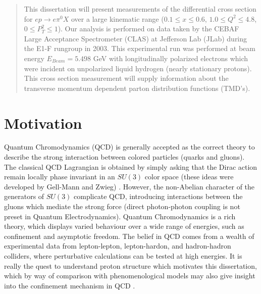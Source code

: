 \begin{abstract}

This dissertation will present measurements of the differential cross section for $e p \rightarrow e \pi^{0} X$ over a large kinematic range ($0.1 \leq x \leq 0.6$, $1.0 \leq Q^{2} \leq 4.8$, $0 \leq P_{T}^{2} \leq 1$).  Our analysis is performed on data taken by the CEBAF Large Acceptance Spectrometer (CLAS) at Jefferson Lab (JLab) during the E1-F rungroup in 2003.  This experimental run was performed at beam energy $E_{Beam} = 5.498$ GeV with longitudinally polarized electrons which were incident on unpolarized liquid hydrogen (nearly stationary protons).  This cross section measurement will supply information about the transverse momentum dependent parton distribution functions (TMD's).

\end{abstract}

\section{Motivation}
Quantum Chromodynamics (QCD) is generally accepted as the correct theory to describe the strong interaction between colored particles (quarks and gluons).  The classical QCD Lagrangian is obtained by simply asking that the Dirac action remain locally phase invariant in an $SU(3)$ color space (these ideas were developed by Gell-Mann and Zwieg) \cite{zwieg}.  However, the non-Abelian character of the generators of $SU(3)$ complicate QCD, introducing interactions between the gluons which mediate the strong force (direct photon-photon coupling is not preset in Quantum Electrodynamics).  Quantum Chromodynamics is a rich theory, which displays varied  behaviour over a wide range of energies, such as confinement and asymptotic freedom.  The belief in QCD comes from a wealth of experimental data from lepton-lepton, lepton-hardon, and hadron-hadron colliders, where perturbative calculations can be tested at high energies.  It is really the quest to understand proton structure which motivates this dissertation, which by way of comparison with phenomenological models may also give insight into the confinement mechanism in QCD \cite{tung}. 





